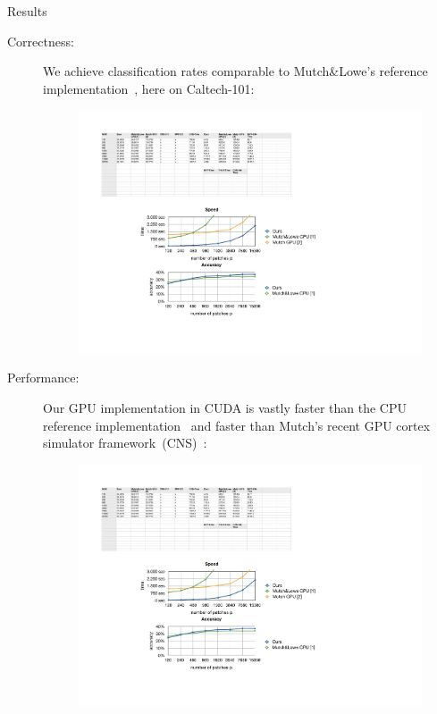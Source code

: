 \documentclass[final]{beamer}
\begin{document}
\begin{frame}{}
\begin{columns}[t]
\begin{column}{.48\linewidth}
        \begin{block}{Results}
				\begin{description}
				\item[ 	Correctness: ]
We achieve classification rates comparable to Mutch\&Lowe's reference implementation~\cite{mutch06}, here on Caltech-101:
				\begin{figure}[htb]
				  \centering
			    \includegraphics[scale=2.25]{images/accuracy} 
				\end{figure}
		\item[ 	Performance: ]
	Our GPU implementation in CUDA is vastly faster than the CPU reference implementation~\cite{mutch06} and faster than Mutch's recent GPU cortex simulator framework~(CNS)~\cite{mutch10}:
		\begin{figure}[htb]
		  \centering
	    \includegraphics[scale=2.25]{images/speed} 

\end{figure}
\end{description}
\end{block}
\end{column}
\end{columns}
\end{frame}
\end{document}
